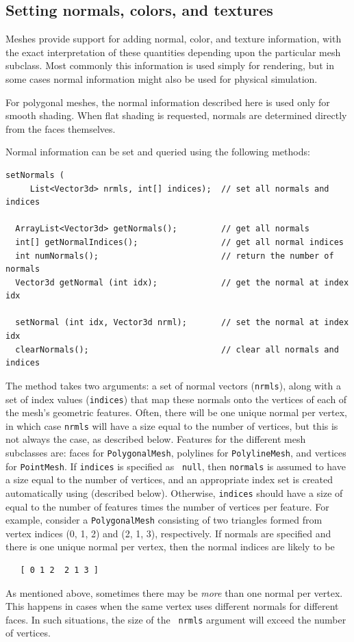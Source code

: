 \subsection{Setting normals, colors, and textures}

Meshes provide support for adding normal, color, and texture
information, with the exact interpretation of these quantities
depending upon the particular mesh subclass. Most commonly this
information is used simply for rendering, but in some cases normal
information might also be used for physical simulation.

\begin{sideblock}
For polygonal meshes, the normal information described here is used
only for smooth shading. When flat shading is requested, normals are
determined directly from the faces themselves.
\end{sideblock}

Normal information can be set and queried using
the following methods:
\begin{lstlisting}[]
  setNormals (
     List<Vector3d> nrmls, int[] indices);  // set all normals and indices

  ArrayList<Vector3d> getNormals();         // get all normals
  int[] getNormalIndices();                 // get all normal indices
  int numNormals();                         // return the number of normals
  Vector3d getNormal (int idx);             // get the normal at index idx

  setNormal (int idx, Vector3d nrml);       // set the normal at index idx
  clearNormals();                           // clear all normals and indices
\end{lstlisting}
%
The method  takes
two arguments: a set of normal vectors ({\tt nrmls}), along with a set
of index values ({\tt indices}) that map these normals onto the
vertices of each of the mesh's geometric features. Often, there will
be one unique normal per vertex, in which case {\tt nrmls} will have a
size equal to the number of vertices, but this is not always the case,
as described below.  Features for the different mesh subclasses are:
faces for {\tt PolygonalMesh}, polylines for {\tt PolylineMesh}, and
vertices for {\tt PointMesh}.  If {\tt indices} is specified as {\tt
null}, then {\tt normals} is assumed to have a size equal to the
number of vertices, and an appropriate index set is created
automatically using
(described below). Otherwise, {\tt indices} should have a size of
equal to the number of features times the number of vertices per
feature. For example, consider a {\tt PolygonalMesh} consisting of two
triangles formed from vertex indices (0, 1, 2) and (2, 1, 3),
respectively. If normals are specified and there is one unique normal
per vertex, then the normal indices are likely to be
%
\begin{verbatim}
   [ 0 1 2  2 1 3 ]
\end{verbatim}
%
As mentioned above, sometimes there may be {\it more} than one normal
per vertex. This happens in cases when the same vertex uses different
normals for different faces. In such situations, the size of the {\tt
nrmls} argument will exceed the number of vertices.

